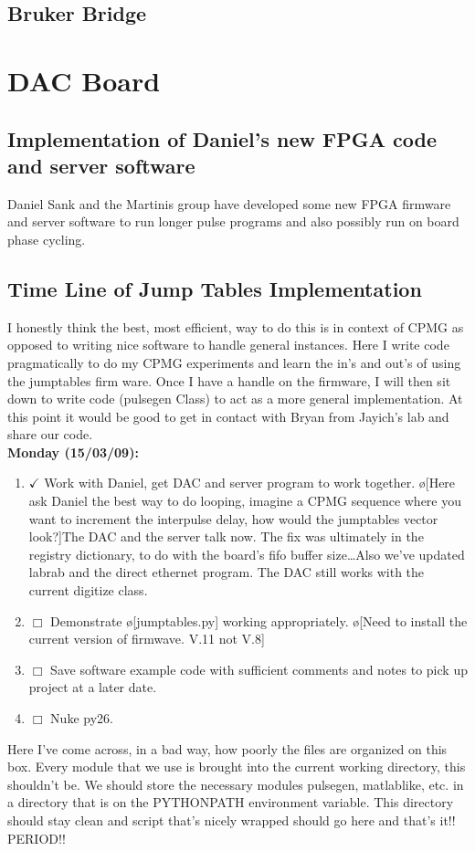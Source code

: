 \documentclass[10pt]{book}
\begin{document}
{\section{Bruker Bridge}

\chapter{DAC Board}
\section{Implementation of Daniel's new FPGA code and server software}
Daniel Sank and the Martinis group have developed some new FPGA firmware and server software to run longer pulse programs and also possibly run on board phase cycling.

\section{Time Line of Jump Tables Implementation}

I honestly think the best, most efficient, way to do this is in context of CPMG as opposed to writing nice software to handle general instances. Here I write code pragmatically to do my CPMG experiments and learn the in's and out's of using the jumptables firm ware. Once I have a handle on the firmware, I will then sit down to write code (pulsegen Class) to act as a more general implementation. At this point it would be good to get in contact with Bryan from Jayich's lab and share our code. \\

{\bf Monday (15/03/09):}
\begin{enumerate}
    \item $\checkmark$ Work with Daniel, get DAC and server program to work together. \o[Here ask Daniel the best way to do looping, imagine a CPMG sequence where you want to increment the interpulse delay, how would the jumptables vector look?]{The DAC and the server talk now. The fix was ultimately in the registry dictionary, to do with the board's fifo buffer size\ldots Also we've updated labrab and the direct ethernet program. The DAC still works with the current digitize class.} 
    \item $\Box$ Demonstrate \o[jumptables.py]{} working appropriately. \o[Need to install the current version of firmwave. V.11 not V.8]{}
    \item $\Box$ Save software example code with sufficient comments and notes to pick up project at a later date. \\
    \item $\Box$ Nuke py26.
\end{enumerate} 
Here I've come across, in a bad way, how poorly the files are organized on this box. Every module that we use is brought into the current working directory, this shouldn't be. We should store the necessary modules pulsegen, matlablike, etc. in a directory that is on the PYTHONPATH environment variable. This directory should stay clean and script that's nicely wrapped should go here and that's it!! PERIOD!!

}
\end{document}
